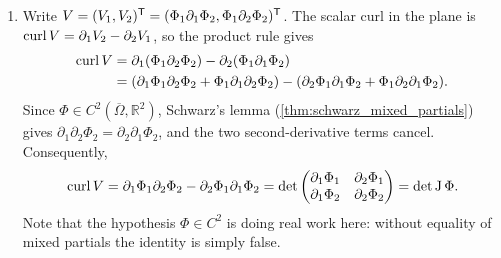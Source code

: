 \begin{exercisesolution}
\label{sol:curl_identity_greens_formula}
\begin{enumerate}[label=\textbf{(\alph*)}]
  \item Write $V = (V_1, V_2)^{\mathsf{T}} = (\Phi_1 \partial_1 \Phi_2, \Phi_1 \partial_2 \Phi_2)^{\mathsf{T}}$.
The scalar curl in the plane is $\operatorname{curl} V = \partial_1 V_2 - \partial_2 V_1$, so the product rule
gives
\begin{align*}
\operatorname{curl} V &= \partial_1 (\Phi_1 \partial_2 \Phi_2) - \partial_2 (\Phi_1 \partial_1 \Phi_2) \\
&= (\partial_1 \Phi_1 \partial_2 \Phi_2 + \Phi_1 \partial_1 \partial_2 \Phi_2) - (\partial_2 \Phi_1 \partial_1 \Phi_2 + \Phi_1 \partial_2 \partial_1 \Phi_2).
\end{align*}
Since $\Phi \in C^2(\overline{\Omega}, \mathbb{R}^2)$, Schwarz's lemma
(\cref{thm:schwarz_mixed_partials}) gives $\partial_1 \partial_2 \Phi_2 = \partial_2 \partial_1
\Phi_2$, and the two second-derivative terms cancel. Consequently,
\[\operatorname{curl} V = \partial_1 \Phi_1 \partial_2 \Phi_2 - \partial_2 \Phi_1 \partial_1 \Phi_2 = \det \begin{pmatrix} \partial_1 \Phi_1 & \partial_2 \Phi_1 \\ \partial_1 \Phi_2 & \partial_2 \Phi_2 \end{pmatrix} = \det \operatorname{J}\Phi.\]
Note that the hypothesis $\Phi \in C^2$ is doing real work here: without equality of mixed partials
the identity is simply false.


\end{enumerate}
\end{exercisesolution}
